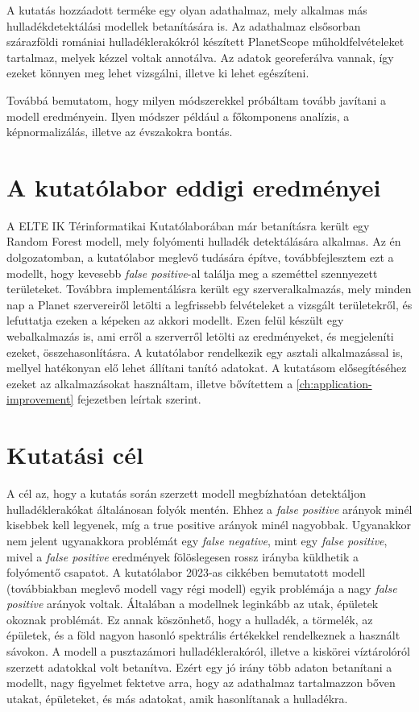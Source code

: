 A kutatás hozzáadott terméke egy olyan adathalmaz, mely alkalmas más hulladékdetektálási modellek betanítására is. Az adathalmaz elsősorban szárazföldi romániai hulladéklerakókról készített PlanetScope műholdfelvételeket tartalmaz, melyek kézzel voltak annotálva. Az adatok georeferálva vannak, így ezeket könnyen meg lehet vizsgálni, illetve ki lehet egészíteni.

Továbbá bemutatom, hogy milyen módszerekkel próbáltam tovább javítani a modell eredményein. Ilyen módszer például a főkomponens analízis, a képnormalizálás, illetve az évszakokra bontás.

\section{A kutatólabor eddigi eredményei}

A ELTE IK Térinformatikai Kutatólaborában már betanításra került egy Random Forest modell, mely folyómenti hulladék detektálására alkalmas. Az én dolgozatomban, a kutatólabor meglevő tudására építve, továbbfejlesztem ezt a modellt, hogy kevesebb \textit{false positive}-al találja meg a szeméttel szennyezett területeket. Továbbra implementálásra került egy szerveralkalmazás, mely minden nap a Planet szervereiről letölti a legfrissebb felvételeket a vizsgált területekről, és lefuttatja ezeken a képeken az akkori modellt. Ezen felül készült egy webalkalmazás is, ami erről a szerverről letölti az eredményeket, és megjeleníti ezeket, összehasonlításra. A kutatólabor rendelkezik egy asztali alkalmazással is, mellyel hatékonyan elő lehet állítani tanító adatokat. A kutatásom elősegítéséhez ezeket az alkalmazásokat használtam, illetve bővítettem a \ref{ch:application-improvement} fejezetben leírtak szerint.

\section{Kutatási cél}
\label{ch:goals}

A cél az, hogy a kutatás során szerzett modell megbízhatóan detektáljon hulladéklerakókat általánosan folyók mentén. Ehhez a \textit{false positive} arányok minél kisebbek kell legyenek, míg a true positive arányok minél nagyobbak. Ugyanakkor nem jelent ugyanakkora problémát egy \textit{false negative}, mint egy \textit{false positive}, mivel a \textit{false positive} eredmények fölöslegesen rossz irányba küldhetik a folyómentő csapatot. 
A kutatólabor 2023-as cikkében bemutatott modell (továbbiakban meglevő modell vagy régi modell) \cite{magyar2023} egyik problémája a nagy \textit{false positive} arányok voltak. Általában a modellnek leginkább az utak, épületek okoznak problémát. Ez annak köszönhető, hogy a hulladék, a törmelék, az épületek, és a föld nagyon hasonló spektrális értékekkel rendelkeznek a használt sávokon. A modell a pusztazámori hulladéklerakóról, illetve a kiskörei víztárolóról szerzett adatokkal volt betanítva. Ezért egy jó irány több adaton betanítani a modellt, nagy figyelmet fektetve arra, hogy az adathalmaz tartalmazzon bőven utakat, épületeket, és más adatokat, amik hasonlítanak a hulladékra. 

